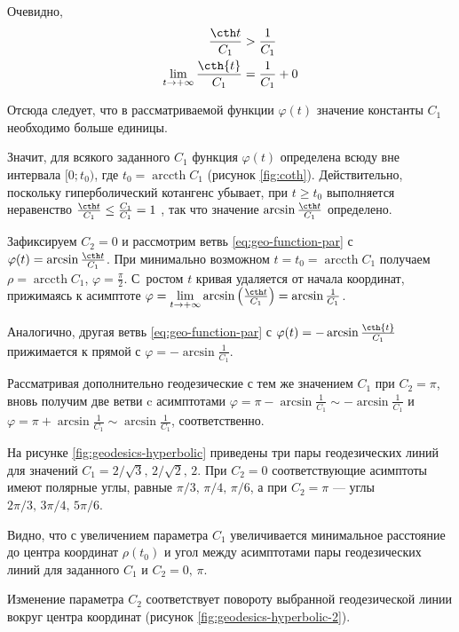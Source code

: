 \documentclass{article}
\numberwithin{equation}{section}
\renewcommand{\phi}{\varphi}
\DeclareMathOperator{\arccth}{arccth}
\begin{document}


Очевидно,
\begin{align*}
  \frac{\cth t}{C_1} &> \frac{1}{C_1} \\
  \lim_{t \to +\infty}{\frac{\cth{t}}{C_1}} &= \frac{1}{C_1} + 0
\end{align*}

Отсюда следует, что в рассматриваемой функции $\phi(t)$ значение
константы $C_1$ необходимо больше единицы.

Значит, для всякого заданного $C_1$ функция $\phi(t)$ определена всюду
вне интервала $[0;t_0)$, где $t_0 = \arccth{C_1}$ (рисунок
\ref{fig:coth}). Действительно, поскольку гиперболический котангенс
убывает, при $t \geq t_0$ выполняется неравенство $\frac{\cth t}{C_1}
\leq \frac{C_1}{C_1} = 1$ , так что значение
$\arcsin{\frac{\cth t}{C_1}}$ определено.

Зафиксируем $C_2 = 0$ и рассмотрим ветвь \eqref{eq:geo-function-par} с
$\phi(t) = \arcsin\frac{\cth t}{C_1}$. При минимально возможном $t =
t_0 = \arccth{C_1}$ получаем $\rho = \arccth{C_1}$, $\phi =
\frac{\pi}{2}$. С ростом $t$ кривая удаляется от начала координат,
прижимаясь к асимптоте $\phi = \lim \limits_{t \to +\infty}
\arcsin{\left(\frac{\cth t}{C_1}\right)} = \arcsin{\frac{1}{C_1}}$.

Аналогично, другая ветвь \eqref{eq:geo-function-par} с $\phi(t) =
-\arcsin\frac{\cth{t}}{C_1}$ прижимается к прямой с $\phi =
-\arcsin{\frac{1}{C_1}}$.

Рассматривая дополнительно геодезические с тем же значением $C_1$ при
$C_2 = \pi$, вновь получим две ветви c асимптотами $\phi =
\pi-\arcsin\frac{1}{C_1} \sim -\arcsin\frac{1}{C_1}$ и $\phi =
\pi+\arcsin\frac{1}{C_1} \sim \arcsin\frac{1}{C_1}$, соответственно.



На рисунке \ref{fig:geodesics-hyperbolic} приведены три пары
геодезических линий для значений $C_1=2/\sqrt{3},\,2/\sqrt{2},\,2$.
При $C_2=0$ соответствующие асимптоты имеют полярные углы, равные
$\pi/3,\,\pi/4,\,\pi/6$, а при $C_2=\pi$ — углы
$2\pi/3,\,3\pi/4,\,5\pi/6$.

Видно, что с увеличением параметра $C_1$ увеличивается минимальное
расстояние до центра координат $\rho(t_0)$ и угол между асимптотами
пары геодезических линий для заданного $C_1$ и $C_2=0,\,\pi$.



Изменение параметра $C_2$ соответствует повороту выбранной
геодезической линии вокруг центра координат (рисунок
\ref{fig:geodesics-hyperbolic-2}).
\end{document}
